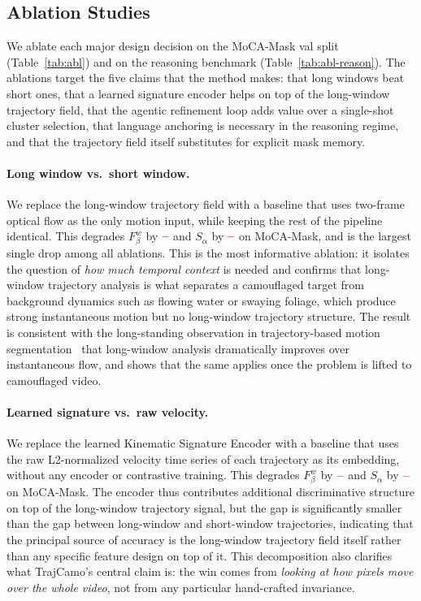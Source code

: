 \documentclass[11pt]{article}
\newcommand{\TBD}{\textcolor{red!70!black}{\textbf{--}}}
\begin{document}
\subsection{Ablation Studies}

We ablate each major design decision on the MoCA-Mask val split (Table~\ref{tab:abl}) and on the reasoning benchmark (Table~\ref{tab:abl-reason}).
The ablations target the five claims that the method makes: that long windows beat short ones, that a learned signature encoder helps on top of the long-window trajectory field, that the agentic refinement loop adds value over a single-shot cluster selection, that language anchoring is necessary in the reasoning regime, and that the trajectory field itself substitutes for explicit mask memory.

\paragraph{Long window vs.\ short window.}
We replace the long-window trajectory field with a baseline that uses two-frame optical flow as the only motion input, while keeping the rest of the pipeline identical.
This degrades $F^w_\beta$ by $\TBD$ and $S_\alpha$ by $\TBD$ on MoCA-Mask, and is the largest single drop among all ablations.
This is the most informative ablation: it isolates the question of \emph{how much temporal context} is needed and confirms that long-window trajectory analysis is what separates a camouflaged target from background dynamics such as flowing water or swaying foliage, which produce strong instantaneous motion but no long-window trajectory structure.
The result is consistent with the long-standing observation in trajectory-based motion segmentation~\cite{broxmalik,ochs2014} that long-window analysis dramatically improves over instantaneous flow, and shows that the same applies once the problem is lifted to camouflaged video.

\paragraph{Learned signature vs.\ raw velocity.}
We replace the learned Kinematic Signature Encoder with a baseline that uses the raw L2-normalized velocity time series of each trajectory as its embedding, without any encoder or contrastive training.
This degrades $F^w_\beta$ by $\TBD$ and $S_\alpha$ by $\TBD$ on MoCA-Mask.
The encoder thus contributes additional discriminative structure on top of the long-window trajectory signal, but the gap is significantly smaller than the gap between long-window and short-window trajectories, indicating that the principal source of accuracy is the long-window trajectory field itself rather than any specific feature design on top of it.
This decomposition also clarifies what TrajCamo's central claim is: the win comes from \emph{looking at how pixels move over the whole video}, not from any particular hand-crafted invariance.
\end{document}
